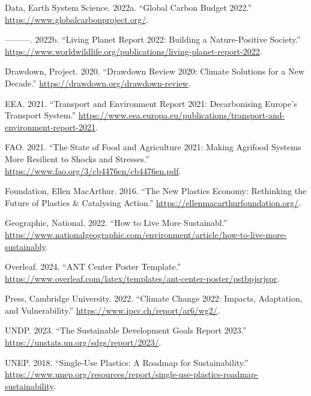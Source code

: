 \documentclass[
]{article}
\newlength{\cslhangindent}
\newenvironment{CSLReferences}[2] %
 {\begin{list}{}{%
  \setlength{\itemindent}{0pt}
  \setlength{\leftmargin}{0pt}
  \setlength{\parsep}{0pt}
  \ifodd #1
   \setlength{\leftmargin}{\cslhangindent}
   \setlength{\itemindent}{-1\cslhangindent}
  \fi
  \setlength{\itemsep}{#2\baselineskip}}}
 {\end{list}}
\begin{document}
\label{refs}
\begin{CSLReferences}{1}{0}
Data, Earth System Science. 2022a. {``Global Carbon Budget 2022.''}
\url{https://www.globalcarbonproject.org/}.

---------. 2022b. {``Living Planet Report 2022: Building a
Nature-Positive Society.''}
\url{https://www.worldwildlife.org/publications/living-planet-report-2022}.

Drawdown, Project. 2020. {``Drawdown Review 2020: Climate Solutions for
a New Decade.''} \url{https://drawdown.org/drawdown-review}.

EEA. 2021. {``Transport and Environment Report 2021: Decarbonising
Europe's Transport System.''}
\url{https://www.eea.europa.eu/publications/transport-and-environment-report-2021}.

FAO. 2021. {``The State of Food and Agriculture 2021: Making Agrifood
Systems More Resilient to Shocks and Stresses.''}
\url{https://www.fao.org/3/cb4476en/cb4476en.pdf}.

Foundation, Ellen MacArthur. 2016. {``The New Plastics Economy:
Rethinking the Future of Plastics \& Catalysing Action.''}
\url{https://ellenmacarthurfoundation.org/}.

Geographic, National. 2022. {``How to Live More Sustainabl.''}
\url{https://www.nationalgeographic.com/environment/article/how-to-live-more-sustainably}.

Overleaf. 2024. {``ANT Center Poster Template.''}
\url{https://www.overleaf.com/latex/templates/ant-center-poster/pstbpjsrjspr}.

Press, Cambridge University. 2022. {``Climate Change 2022: Impacts,
Adaptation, and Vulnerability.''}
\url{https://www.ipcc.ch/report/ar6/wg2/}.

UNDP. 2023. {``The Sustainable Development Goals Report 2023.''}
\url{https://unstats.un.org/sdgs/report/2023/}.

UNEP. 2018. {``Single-Use Plastics: A Roadmap for Sustainability.''}
\url{https://www.unep.org/resources/report/single-use-plastics-roadmap-sustainability}.

\end{CSLReferences}
\end{document}
